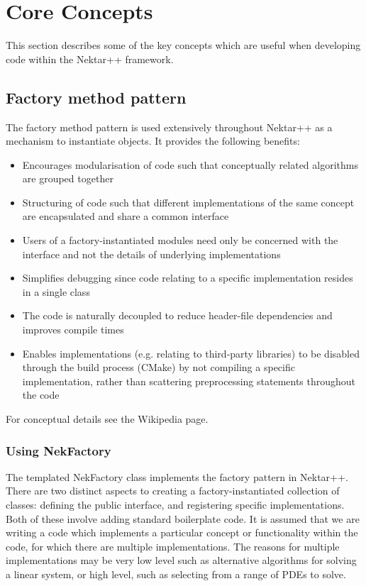 \chapter{Core Concepts}

This section describes some of the key concepts which are useful when developing
code within the Nektar++ framework.

\section{Factory method pattern}
The factory method pattern is used extensively throughout Nektar++ as a
mechanism to instantiate objects. It provides the following benefits:
\begin{itemize}
\item Encourages modularisation of code such that conceptually related
algorithms are grouped together
\item Structuring of code such that different implementations of the same
concept are encapsulated and share a common interface
\item Users of a factory-instantiated modules need only be concerned with the
 interface and not the details of underlying implementations
\item Simplifies debugging since code relating to a specific implementation
 resides in a single class
\item The code is naturally decoupled to reduce header-file dependencies and
 improves compile times
\item Enables implementations (e.g. relating to third-party libraries) to be
 disabled through the build process (CMake) by not compiling a specific 
 implementation, rather than scattering preprocessing statements throughout the
 code
\end{itemize}

For conceptual details see the Wikipedia page.

\subsection{Using NekFactory}
The templated NekFactory class implements the factory pattern in Nektar++.
There are two distinct aspects to creating a factory-instantiated collection of
classes: defining the public interface, and registering specific
implementations. Both of these involve adding standard boilerplate code. It is
assumed that we are writing a code which implements a particular concept or
functionality within the code, for which there are multiple implementations. The
reasons for multiple implementations may be very low level such as alternative
algorithms for solving a linear system, or high level, such as selecting from a
range of PDEs to solve.


